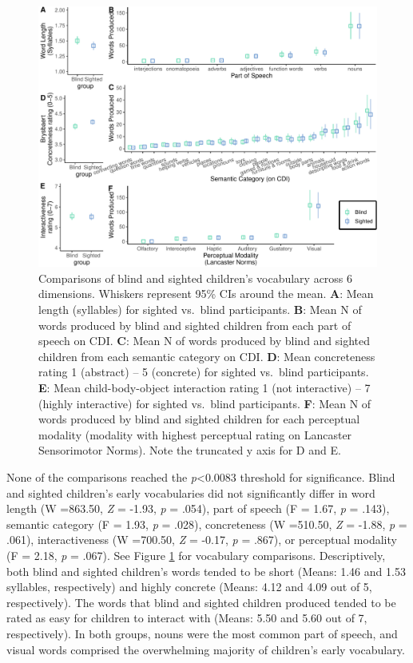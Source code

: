 \documentclass[
  man,floatsintext]{apa6}
\begin{document}
\begin{figure}
\centering
\includegraphics{VI_CDI_manuscript_files/figure-latex/vocab-comparison-1.pdf}
\caption{\label{fig:vocab-comparison}Comparisons of blind and sighted children's vocabulary across 6 dimensions. Whiskers represent 95\% CIs around the mean. \textbf{A}: Mean length (syllables) for sighted vs.~blind participants. \textbf{B}: Mean N of words produced by blind and sighted children from each part of speech on CDI. \textbf{C}: Mean N of words produced by blind and sighted children from each semantic category on CDI. \textbf{D}: Mean concreteness rating 1 (abstract) -- 5 (concrete) for sighted vs.~blind participants. \textbf{E}: Mean child-body-object interaction rating 1 (not interactive) -- 7 (highly interactive) for sighted vs.~blind participants. \textbf{F}: Mean N of words produced by blind and sighted children for each perceptual modality (modality with highest perceptual rating on Lancaster Sensorimotor Norms). Note the truncated y axis for D and E.}
\end{figure}

None of the comparisons reached the \emph{p}\textless0.0083 threshold for significance. Blind and sighted children's early vocabularies did not significantly differ in word length (W =863.50, \emph{Z} = -1.93, \emph{p} = .054), part of speech (F = 1.67, \emph{p} = .143), semantic category (F = 1.93, \emph{p} = .028), concreteness (W =510.50, \emph{Z} = -1.88, \emph{p} = .061), interactiveness (W =700.50, \emph{Z} = -0.17, \emph{p} = .867), or perceptual modality (F = 2.18, \emph{p} = .067). See Figure \ref{fig:vocab-comparison} for vocabulary comparisons. Descriptively, both blind and sighted children's words tended to be short (Means: 1.46 and 1.53 syllables, respectively) and highly concrete (Means: 4.12 and 4.09 out of 5, respectively). The words that blind and sighted children produced tended to be rated as easy for children to interact with (Means: 5.50 and 5.60 out of 7, respectively). In both groups, nouns were the most common part of speech, and visual words comprised the overwhelming majority of children's early vocabulary.
\end{document}
